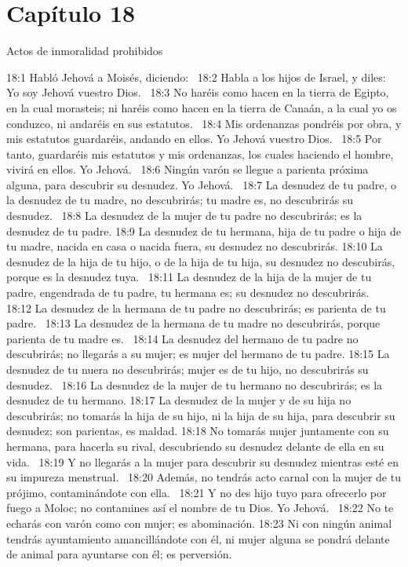 \section*{Capítulo 18}
Actos de inmoralidad prohibidos  

18:1 Habló Jehová a Moisés, diciendo:  
18:2 Habla a los hijos de Israel, y diles: Yo soy Jehová vuestro Dios.  
18:3 No haréis como hacen en la tierra de Egipto, en la cual morasteis; ni haréis como hacen en la tierra de Canaán, a la cual yo os conduzco, ni andaréis en sus estatutos.  
18:4 Mis ordenanzas pondréis por obra, y mis estatutos guardaréis, andando en ellos. Yo Jehová vuestro Dios.  
18:5 Por tanto, guardaréis mis estatutos y mis ordenanzas, los cuales haciendo el hombre, vivirá en ellos. Yo Jehová.  
18:6 Ningún varón se llegue a parienta próxima alguna, para descubrir su desnudez. Yo Jehová.  
18:7 La desnudez de tu padre, o la desnudez de tu madre, no descubrirás; tu madre es, no descubrirás su desnudez.  
18:8 La desnudez de la mujer de tu padre no descubrirás; es la desnudez de tu padre. 
18:9 La desnudez de tu hermana, hija de tu padre o hija de tu madre, nacida en casa o nacida fuera, su desnudez no descubrirás. 
18:10 La desnudez de la hija de tu hijo, o de la hija de tu hija, su desnudez no descubirás, porque es la desnudez tuya.  
18:11 La desnudez de la hija de la mujer de tu padre, engendrada de tu padre, tu hermana es; su desnudez no descubrirás.  
18:12 La desnudez de la hermana de tu padre no descubrirás; es parienta de tu padre.  
18:13 La desnudez de la hermana de tu madre no descubrirás, porque parienta de tu madre es.  
18:14 La desnudez del hermano de tu padre no descubrirás; no llegarás a su mujer; es mujer del hermano de tu padre. 
18:15 La desnudez de tu nuera no descubrirás; mujer es de tu hijo, no descubrirás su desnudez.  
18:16 La desnudez de la mujer de tu hermano no descubrirás; es la desnudez de tu hermano. 
18:17 La desnudez de la mujer y de su hija no descubrirás; no tomarás la hija de su hijo, ni la hija de su hija, para descubrir su desnudez; son parientas, es maldad. 
18:18 No tomarás mujer juntamente con su hermana, para hacerla su rival, descubriendo su desnudez delante de ella en su vida.  
18:19 Y no llegarás a la mujer para descubrir su desnudez mientras esté en su impureza menstrual.  
18:20 Además, no tendrás acto carnal con la mujer de tu prójimo, contaminándote con ella.  
18:21 Y no des hijo tuyo para ofrecerlo por fuego a Moloc; no contamines así el nombre de tu Dios. Yo Jehová.  
18:22 No te echarás con varón como con mujer; es abominación. 
18:23 Ni con ningún animal tendrás ayuntamiento amancillándote con él, ni mujer alguna se pondrá delante de animal para ayuntarse con él; es perversión.  

